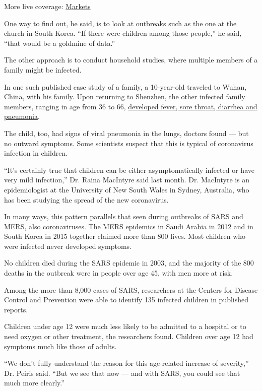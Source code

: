 More live coverage:
\href{https://www.nytimes3xbfgragh.onion/live/2020/09/08/business/stock-market-today-coronavirus?action=click\&pgtype=Article\&state=default\&region=MAIN_CONTENT_1\&context=storylines_live_updates}{Markets}

One way to find out, he said, is to look at outbreaks such as the one at
the church in South Korea. ``If there were children among those
people,'' he said, ``that would be a goldmine of data.''

The other approach is to conduct household studies, where multiple
members of a family might be infected.

In one such published case study of a family, a 10-year-old traveled to
Wuhan, China, with his family. Upon returning to Shenzhen, the other
infected family members, ranging in age from 36 to 66,
\href{https://www.thelancet.com/journals/lancet/article/PIIS0140-6736(20)30154-9/fulltext}{developed
fever, sore throat, diarrhea and pneumonia}.

The child, too, had signs of viral pneumonia in the lungs, doctors found
--- but no outward symptoms. Some scientists suspect that this is
typical of coronavirus infection in children.

``It's certainly true that children can be either asymptomatically
infected or have very mild infection,'' Dr. Raina MacIntyre said last
month. Dr. MacIntyre is an epidemiologist at the University of New South
Wales in Sydney, Australia, who has been studying the spread of the new
coronavirus.

In many ways, this pattern parallels that seen during outbreaks of SARS
and MERS, also coronaviruses. The MERS epidemics in Saudi Arabia in 2012
and in South Korea in 2015 together claimed more than 800 lives. Most
children who were infected never developed symptoms.

No children died during the SARS epidemic in 2003, and the majority of
the 800 deaths in the outbreak were in people over age 45, with men more
at risk.

Among the more than 8,000 cases of SARS, researchers at the Centers for
Disease Control and Prevention were able to identify 135 infected
children in published reports.

Children under age 12 were much less likely to be admitted to a hospital
or to need oxygen or other treatment, the researchers found. Children
over age 12 had symptoms much like those of adults.

``We don't fully understand the reason for this age-related increase of
severity,'' Dr. Peiris said. ``But we see that now --- and with SARS,
you could see that much more clearly.''


